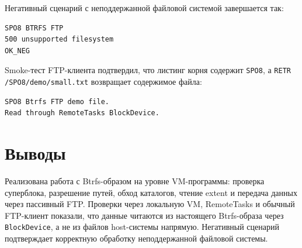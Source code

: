 \documentclass[a4paper,12pt]{article}
\begin{document}
Негативный сценарий с неподдержанной файловой системой завершается так:
\begin{lstlisting}
SPO8 BTRFS FTP
500 unsupported filesystem
OK_NEG
\end{lstlisting}

Smoke-тест FTP-клиента подтвердил, что листинг корня содержит \texttt{SPO8}, а \texttt{RETR /SPO8/demo/small.txt} возвращает содержимое файла:
\begin{lstlisting}
SPO8 Btrfs FTP demo file.
Read through RemoteTasks BlockDevice.
\end{lstlisting}

\section{Выводы}
Реализована работа с Btrfs-образом на уровне VM-программы: проверка суперблока, разрешение путей, обход каталогов, чтение extent и передача данных через пассивный FTP. Проверки через локальную VM, RemoteTasks и обычный FTP-клиент показали, что данные читаются из настоящего Btrfs-образа через \texttt{BlockDevice}, а не из файлов host-системы напрямую. Негативный сценарий подтверждает корректную обработку неподдержанной файловой системы.
\end{document}
